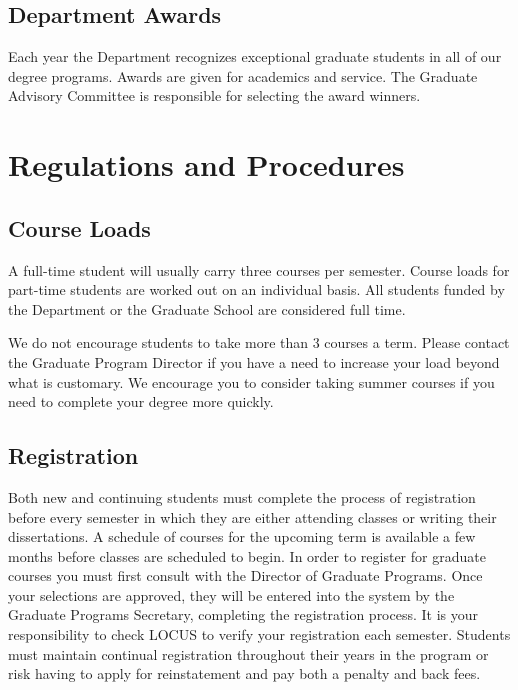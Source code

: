 \documentclass[letterpaper,10pt,english]{sphinxmanual}
\begin{document}
\section{Department Awards}
\label{general:department-awards}
Each year the Department recognizes exceptional graduate students in all of our degree programs. Awards are given for academics and service. The Graduate Advisory Committee is responsible for selecting the award winners.


\chapter{Regulations and Procedures}
\label{regulations:regulations-and-procedures}\label{regulations::doc}\label{regulations:index-0}

\section{Course Loads}
\label{regulations:course-loads}
A full-time student will usually carry three courses per semester. Course loads for part-time students are worked out on an individual basis. All students funded by the Department or the Graduate School are considered full time.

We do not encourage students to take more than 3 courses a term. Please contact the Graduate Program Director if you have a need to increase your load beyond what is customary. We encourage you to consider taking summer courses if you need to complete your degree more quickly.


\section{Registration}
\label{regulations:registration}
Both new and continuing students must complete the process of registration before every semester in which they are either attending classes or writing their dissertations. A schedule of courses for the upcoming term is available a few months before classes are scheduled to begin. In order to register for graduate courses you must first consult with the Director of Graduate Programs. Once your selections are approved, they will be entered into the system by the Graduate Programs Secretary, completing the registration process. It is your responsibility to check LOCUS to verify your registration each semester. Students must maintain continual registration throughout their years in the program or risk having to apply for reinstatement and pay both a penalty and back fees.
\end{document}
